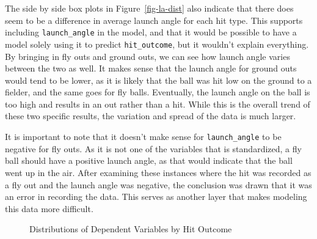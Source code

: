 \documentclass[
  letterpaper,
  DIV=11,
  numbers=noendperiod]{scrartcl}
\begin{document}
The side by side box plots in Figure~\ref{fig-la-dist} also indicate
that there does seem to be a difference in average launch angle for each
hit type. This supports including \texttt{launch\_angle} in the model,
and that it would be possible to have a model solely using it to predict
\texttt{hit\_outcome}, but it wouldn't explain everything. By bringing
in fly outs and ground outs, we can see how launch angle varies between
the two as well. It makes sense that the launch angle for ground outs
would tend to be lower, as it is likely that the ball was hit low on the
ground to a fielder, and the same goes for fly balls. Eventually, the
launch angle on the ball is too high and results in an out rather than a
hit. While this is the overall trend of these two specific results, the
variation and spread of the data is much larger.

It is important to note that it doesn't make sense for
\texttt{launch\_angle} to be negative for fly outs. As it is not one of
the variables that is standardized, a fly ball should have a positive
launch angle, as that would indicate that the ball went up in the air.
After examining these instances where the hit was recorded as a fly out
and the launch angle was negative, the conclusion was drawn that it was
an error in recording the data. This serves as another layer that makes
modeling this data more difficult.

\begin{figure}[H]


\caption{\label{fig-dists-vars}Distributions of Dependent Variables by
Hit Outcome}

\end{figure}%
\end{document}
